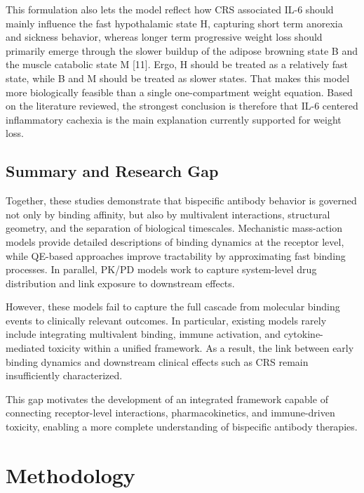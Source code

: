 \documentclass[11pt]{article}
\begin{document}
This formulation also lets the model reflect how CRS associated IL-6 should mainly influence the fast hypothalamic state H, capturing short term anorexia and sickness behavior, whereas longer term progressive weight loss should primarily emerge through the slower buildup of the adipose browning state B and the muscle catabolic state M [11]. Ergo, H should be treated as a relatively fast state, while B and M should be treated as slower states. That makes this model more biologically feasible than a single one-compartment weight equation. Based on the literature reviewed, the strongest conclusion is therefore that IL-6 centered inflammatory cachexia is the main explanation currently supported for weight loss.
\par\medskip

\subsection{Summary and Research Gap}

Together, these studies demonstrate that bispecific antibody behavior is governed not only by binding affinity, but also by multivalent interactions, structural geometry, and the separation of biological timescales. Mechanistic mass-action models provide detailed descriptions of binding dynamics at the receptor level, while QE-based approaches improve tractability by approximating fast binding processes. In parallel, PK/PD models work to capture system-level drug distribution and link exposure to downstream effects.
\par\medskip

However, these models fail to capture the full cascade from molecular binding events to clinically relevant outcomes. In particular, existing models rarely include integrating multivalent binding, immune activation, and cytokine-mediated toxicity within a unified framework. As a result, the link between early binding dynamics and downstream clinical effects such as CRS remain insufficiently characterized.
\par\medskip

This gap motivates the development of an integrated framework capable of connecting receptor-level interactions, pharmacokinetics, and immune-driven toxicity, enabling a more complete understanding of bispecific antibody therapies.
\par\medskip

\section{Methodology}
\end{document}
